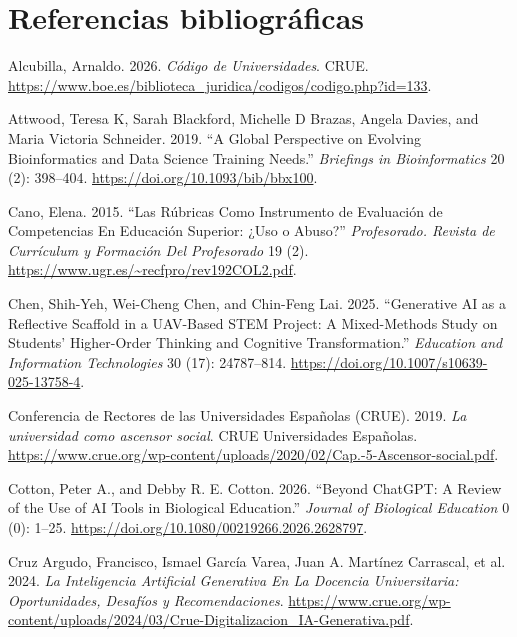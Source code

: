\documentclass[
  11pt,
  a4paper,
  twoside]{scrreprt}
\newlength{\cslhangindent}
\newenvironment{CSLReferences}[2] %
 {\begin{list}{}{%
  \setlength{\itemindent}{0pt}
  \setlength{\leftmargin}{0pt}
  \setlength{\parsep}{0pt}
  \ifodd #1
   \setlength{\leftmargin}{\cslhangindent}
   \setlength{\itemindent}{-1\cslhangindent}
  \fi
  \setlength{\itemsep}{#2\baselineskip}}}
 {\end{list}}
\begin{document}

\chapter{Referencias
bibliográficas}\label{referencias-bibliogruxe1ficas}

\protect{}\label{refs}
\begin{CSLReferences}{1}{1}
Alcubilla, Arnaldo. 2026. \emph{Código de Universidades}. CRUE.
\url{https://www.boe.es/biblioteca_juridica/codigos/codigo.php?id=133}.

Attwood, Teresa K, Sarah Blackford, Michelle D Brazas, Angela Davies,
and Maria Victoria Schneider. 2019. {``A Global Perspective on Evolving
Bioinformatics and Data Science Training Needs.''} \emph{Briefings in
Bioinformatics} 20 (2): 398--404.
\url{https://doi.org/10.1093/bib/bbx100}.

Cano, Elena. 2015. {``Las Rúbricas Como Instrumento de Evaluación de
Competencias En Educación Superior: ¿Uso o Abuso?''} \emph{Profesorado.
Revista de Currículum y Formación Del Profesorado} 19 (2).
\url{https://www.ugr.es/~recfpro/rev192COL2.pdf}.

Chen, Shih-Yeh, Wei-Cheng Chen, and Chin-Feng Lai. 2025. {``Generative
{AI} as a Reflective Scaffold in a {UAV}-Based {STEM} Project: {A}
Mixed-Methods Study on Students' Higher-Order Thinking and Cognitive
Transformation.''} \emph{Education and Information Technologies} 30
(17): 24787--814. \url{https://doi.org/10.1007/s10639-025-13758-4}.

Conferencia de Rectores de las Universidades Españolas (CRUE). 2019.
\emph{La universidad como ascensor social}. CRUE Universidades
Españolas.
\url{https://www.crue.org/wp-content/uploads/2020/02/Cap.-5-Ascensor-social.pdf}.

Cotton, Peter A., and Debby R. E. Cotton. 2026. {``Beyond {ChatGPT}: A
Review of the Use of {AI} Tools in Biological Education.''}
\emph{Journal of Biological Education} 0 (0): 1--25.
\url{https://doi.org/10.1080/00219266.2026.2628797}.

Cruz Argudo, Francisco, Ismael García Varea, Juan A. Martínez Carrascal,
et al. 2024. \emph{La Inteligencia Artificial Generativa En La Docencia
Universitaria: Oportunidades, Desafíos y Recomendaciones}.
\url{https://www.crue.org/wp-content/uploads/2024/03/Crue-Digitalizacion_IA-Generativa.pdf}.


\end{CSLReferences}
\end{document}
